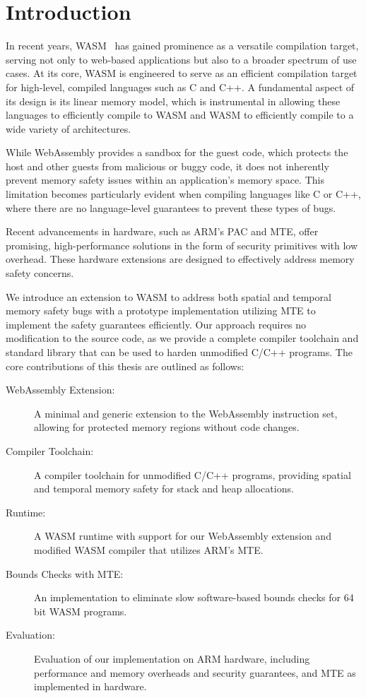 \chapter{Introduction}
\label{ch:intro}

In recent years, \ac{WASM}~\cite{haas2017bringing} has gained prominence as a versatile compilation target, serving not only to web-based applications but also to a broader spectrum of use cases.
At its core, \ac{WASM} is engineered to serve as an efficient compilation target for high-level, compiled languages such as C and C++.
A fundamental aspect of its design is its linear memory model, which is instrumental in allowing these languages to efficiently compile to \ac{WASM} and \ac{WASM} to efficiently compile to a wide variety of architectures.

While WebAssembly provides a sandbox for the guest code, which protects the host and other guests from malicious or buggy code, it does not inherently prevent memory safety issues within an application's memory space.
This limitation becomes particularly evident when compiling languages like C or C++, where there are no language-level guarantees to prevent these types of bugs.

Recent advancements in hardware, such as ARM's \ac{PAC} and \acf{MTE}, offer promising, high-performance solutions in the form of security primitives with low overhead.
These hardware extensions are designed to effectively address memory safety concerns.

We introduce an extension to \ac{WASM} to address both spatial and temporal memory safety bugs with a prototype implementation utilizing \ac{MTE} to implement the safety guarantees efficiently.
Our approach requires no modification to the source code, as we provide a complete compiler toolchain and standard library that can be used to harden unmodified C/C++ programs.
The core contributions of this thesis are outlined as follows:

\begin{description}
    \item[WebAssembly Extension:] A minimal and generic extension to the WebAssembly instruction set, allowing for protected memory regions without code changes.
    \item[Compiler Toolchain:] A compiler toolchain for unmodified C/C++ programs, providing spatial and temporal memory safety for stack and heap allocations.
    \item[Runtime:] A \ac{WASM} runtime with support for our WebAssembly extension and modified \ac{WASM} compiler that utilizes ARM's \ac{MTE}.
    \item[Bounds Checks with \ac{MTE}:] An implementation to eliminate slow software-based bounds checks for 64\,bit \ac{WASM} programs.
    \item[Evaluation:] Evaluation of our implementation on ARM hardware, including performance and memory overheads and security guarantees, and \ac{MTE} as implemented in hardware.
\end{description}
